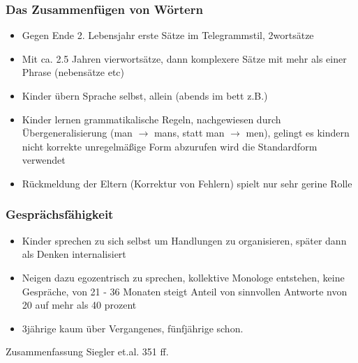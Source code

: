 \subsubsection{Das Zusammenfügen von Wörtern}
\begin{itemize}
	\item
		Gegen Ende 2. Lebensjahr erste Sätze im Telegrammstil, 2wortsätze
	\item
		Mit ca. 2.5 Jahren vierwortsätze, dann komplexere Sätze mit mehr als einer Phrase (nebensätze etc)
	\item Kinder übern Sprache selbst, allein (abends im bett z.B.)
	\item
		Kinder lernen grammatikalische Regeln, nachgewiesen durch Übergeneralisierung (man $\rightarrow$ mans, statt man  $\rightarrow$  men), gelingt es kindern nicht korrekte unregelmäßige Form abzurufen wird die Standardform verwendet
	\item
		Rückmeldung der Eltern (Korrektur von Fehlern) spielt nur sehr gerine Rolle
\end{itemize}

\subsubsection{Gesprächsfähigkeit}
\begin{itemize}
	\item
		Kinder sprechen zu sich selbst um Handlungen zu organisieren, später dann als Denken internalisiert
	\item
		Neigen dazu egozentrisch zu sprechen, kollektive Monologe entstehen, keine Gespräche, von 21 - 36 Monaten steigt Anteil von sinnvollen Antworte nvon 20 auf mehr als 40 prozent
	\item
		3jährige kaum über Vergangenes, fünfjährige schon.  
\end{itemize}

Zusammenfassung Siegler et.al. 351 ff.

